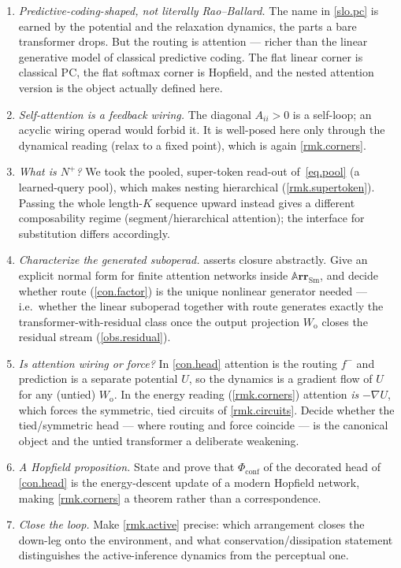 \documentclass[11pt]{article}
\theoremstyle{plain}
\theoremstyle{definition}
\theoremstyle{remark}
\newcommand{\Cat}[1]{\mathbf{#1}}
\newcommand{\Sm}{\mathrm{Sm}}
\newcommand{\arr}{\mathbb{A}\Cat{rr}}    %
\newcommand{\sarr}{\arr_{\Sm}}           %
\newcommand{\inpt}[1]{#1^{-}}
\newcommand{\outp}[1]{#1^{+}}
\newcommand{\conf}{\mathrm{conf}}
\newcommand{\Phiconf}{\Phi_{\conf}}
\newcommand{\Wo}{W_{\mathrm o}}
\begin{document}
\begin{enumerate}
\item \emph{Predictive-coding-shaped, not literally Rao--Ballard.} The name
in \cref{slo.pc} is earned by the potential and the relaxation dynamics,
the parts a bare transformer drops. But the routing is attention --- richer
than the linear generative model of classical predictive coding. The flat
linear corner is classical PC, the flat softmax corner is Hopfield, and the
nested attention version is the object actually defined here.

\item \emph{Self-attention is a feedback wiring.} The diagonal $A_{ii}>0$
is a self-loop; an acyclic wiring operad would forbid it. It is well-posed
here only through the dynamical reading (relax to a fixed point), which is
again \cref{rmk.corners}.

\item \emph{What is $\outp N$?} We took the pooled, super-token read-out
of~\eqref{eq.pool} (a learned-query pool), which makes nesting hierarchical
(\cref{rmk.supertoken}). Passing the whole length-$K$ sequence upward
instead gives a different composability regime (segment/hierarchical
attention); the interface for substitution differs accordingly.

\item \emph{Characterize the generated suboperad.} 
asserts closure abstractly. Give an explicit normal form for finite
attention networks inside $\sarr$, and decide whether $\mathrm{route}$
(\cref{con.factor}) is the unique nonlinear generator needed --- i.e.\
whether the linear suboperad together with $\mathrm{route}$ generates
exactly the transformer-with-residual class once the output projection
$\Wo$ closes the residual stream (\cref{obs.residual}).

\item \emph{Is attention wiring or force?} In \cref{con.head} attention is
the routing $\inpt f$ and prediction is a separate potential $U$, so the
dynamics is a gradient flow of $U$ for any (untied) $\Wo$. In the energy
reading (\cref{rmk.corners}) attention \emph{is} $-\nabla U$, which forces
the symmetric, tied circuits of \cref{rmk.circuits}. Decide whether the
tied/symmetric head --- where routing and force coincide --- is the
canonical object and the untied transformer a deliberate weakening.

\item \emph{A Hopfield proposition.} State and prove that $\Phiconf$ of the
decorated head of \cref{con.head} is the energy-descent update of a modern
Hopfield network, making \cref{rmk.corners} a theorem rather than a
correspondence.

\item \emph{Close the loop.} Make \cref{rmk.active} precise: which
arrangement closes the down-leg onto the environment, and what
conservation/dissipation statement distinguishes the active-inference
dynamics from the perceptual one.
\end{enumerate}
\end{document}
